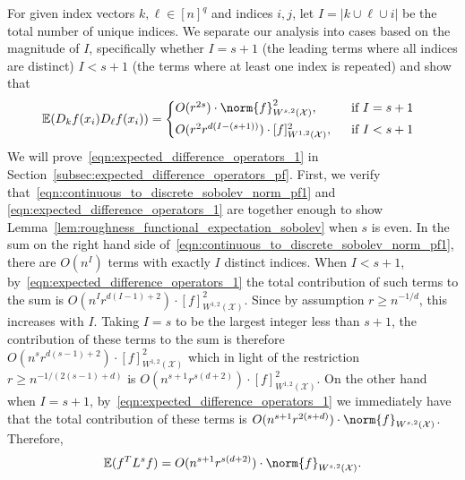 \documentclass{article}
\newcommand{\abs}[1]{\left \lvert #1 \right \rvert}
\newcommand{\1}{\mathbf{1}}
\newcommand{\Xset}{\mathcal{X}}
\newcommand{\Ebb}{\mathbb{E}}
\theoremstyle{alden}
\theoremstyle{aldenthm}
\theoremstyle{definition}
\theoremstyle{remark}
\begin{document}
For given index vectors $k,\ell \in [n]^q$ and indices $i,j$, let $I = \abs{k \cup \ell \cup i}$ be the total number of unique indices. We separate our analysis into cases based on the magnitude of $I$, specifically whether $I = s + 1$ (the leading terms where all indices are distinct) $I < s + 1$ (the terms where at least one index is repeated) and show that
\begin{equation}
\label{eqn:expected_difference_operators_1}
\Ebb(D_kf(x_i) D_\ell f(x_i)) =
\begin{cases*}
O(r^{2s}) \cdot \norm{f}_{W^{s,2}(\Xset)}^2, & ~~\textrm{if $I = s + 1$} \\
O(r^{2} r^{d(I - (s + 1))}) \cdot [f]_{W^{1,2}(\Xset)}^2, & ~~\textrm{if $I < s + 1$}~ 
\end{cases*}
\end{equation}
We will prove~\eqref{eqn:expected_difference_operators_1} in Section~\ref{subsec:expected_difference_operators_pf}. First, we verify that~\eqref{eqn:continuous_to_discrete_sobolev_norm_pf1} and \eqref{eqn:expected_difference_operators_1} are together enough to show Lemma~\ref{lem:roughness_functional_expectation_sobolev} when $s$ is even. In the sum on the right hand side of~\eqref{eqn:continuous_to_discrete_sobolev_norm_pf1}, there are $O(n^{I})$ terms with exactly $I$ distinct indices. When $I < s + 1$, by~\eqref{eqn:expected_difference_operators_1} the total contribution of such terms to the sum is $O(n^{I}r^{d(I - 1) + 2}) \cdot [f]_{W^{1,2}(\Xset)}^2$. Since by assumption $r \geq n^{-1/d}$, this increases with $I$. Taking $I = s$ to be the largest integer less than $s + 1$, the contribution of these terms to the sum is therefore $O(n^sr^{d(s - 1) + 2}) \cdot [f]_{W^{1,2}(\Xset)}^2$ which in light of the restriction $r \geq n^{-1/(2(s - 1) + d)}$ is $O(n^{s+1}r^{s(d +2)}) \cdot [f]_{W^{1,2}(\Xset)}^2$. On the other hand when $I = s + 1$, by~\eqref{eqn:expected_difference_operators_1} we immediately have that the total contribution of these terms is $O(n^{s + 1}r^{2(s + d)}) \cdot \norm{f}_{W^{s,2}(\Xset)}$. Therefore,
\begin{equation*}
\Ebb(f^T L^s f) = O(n^{s+1}r^{s(d+2)}) \cdot \norm{f}_{W^{s,2}(\Xset)}.
\end{equation*}
\end{document}
